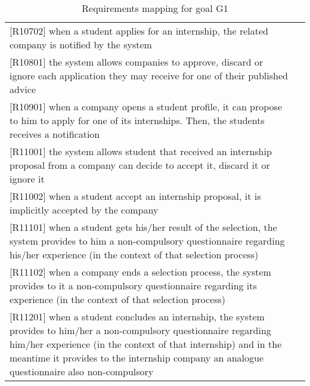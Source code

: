 \begin{table} [h!]
\begin{tabular}{ || P{7.5cm} P{7.5cm} || }
					[R10702] when a student applies for an internship, the related company is notified by the system & \\
					
					[R10801] the system allows companies to approve, discard or ignore each application they may receive for one of their published advice & \\
					
					[R10901] when a company opens a student profile, it can propose to him to apply for one of its internships. Then, the students receives a notification & \\
					
					[R11001] the system allows student that received an internship proposal from a company can decide to accept it, discard it or ignore it & \\
					
					[R11002] when a student accept an internship proposal, it is implicitly accepted by the company & \\
					
					[R11101] when a student gets his/her result of the selection, the system provides to him a non-compulsory questionnaire regarding his/her experience (in the context of that selection process)& \\
					
					[R11102] when a company ends a selection process, the system provides to it a non-compulsory questionnaire regarding its experience (in the context of that selection process) & \\
					
					[R11201] when a student concludes an internship, the system provides to him/her a non-compulsory questionnaire regarding him/her experience (in the context of that internship) and in the meantime it provides to the internship company an analogue questionnaire also non-compulsory & \\
					\hline
				\end{tabular}
				\caption{Requirements mapping for goal G1}
				\label {table:1}
			\end{table}
